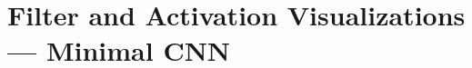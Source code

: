 \section{Filter and Activation Visualizations — Minimal CNN}
\label{sec:Filter and Activation Visualizations — Minimal CNN}

